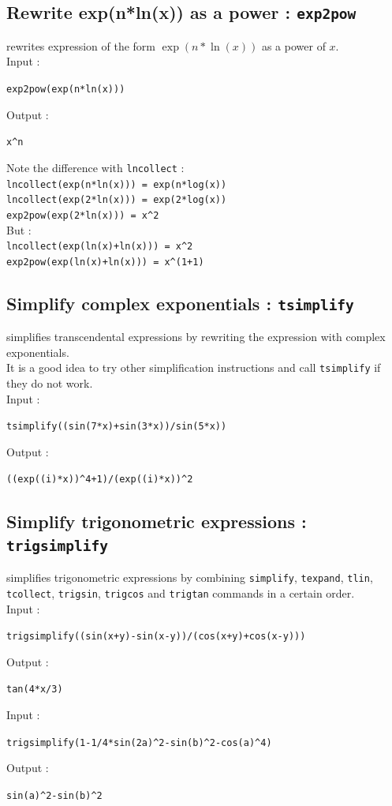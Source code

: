 \documentclass[a4paper,11pt]{book}
\begin{document}
\subsection{Rewrite exp(n*ln(x)) as a power : {\tt exp2pow}}
 rewrites expression of the form $\exp(n*\ln(x))$
as a power of $x$.\\
Input :
\begin{center}{\tt  exp2pow(exp(n*ln(x)))}\end{center}
Output :
\begin{center}{\tt x\verb|^|n}\end{center}
Note the difference with {\tt lncollect} :\\
{\tt lncollect(exp(n*ln(x))) = exp(n*log(x))}\\
{\tt lncollect(exp(2*ln(x))) = exp(2*log(x))}\\
{\tt exp2pow(exp(2*ln(x))) = x\verb|^|2 }\\
But :\\
{\tt lncollect(exp(ln(x)+ln(x))) = x\verb|^|2}\\
{\tt exp2pow(exp(ln(x)+ln(x))) = x\verb|^|(1+1)}\\

\subsection{Simplify complex exponentials : {\tt tsimplify}}
 simplifies transcendental expressions 
by rewriting the expression with complex exponentials.\\
It is a good idea to try other simplification instructions
and call {\tt tsimplify} if they do not work.\\ 
Input :
\begin{center}{\tt tsimplify((sin(7*x)+sin(3*x))/sin(5*x))}\end{center}
Output :
\begin{center}{\tt ((exp((i)*x))\verb|^|4+1)/(exp((i)*x))\verb|^|2 }\end{center}

\subsection{Simplify trigonometric expressions : {\tt trigsimplify}}
 simplifies trigonometric expressions
by combining {\tt simplify}, {\tt texpand}, {\tt tlin}, {\tt tcollect}, {\tt trigsin}, {\tt trigcos} and {\tt trigtan} commands in a certain order.\\
Input :
\begin{center}{\tt trigsimplify((sin(x+y)-sin(x-y))/(cos(x+y)+cos(x-y)))}\end{center}
Output :
\begin{center}{\tt tan(4*x/3)}\end{center}
Input :
\begin{center}{\tt trigsimplify(1-1/4*sin(2a)\verb|^|2-sin(b)\verb|^|2-cos(a)\verb|^|4)}\end{center}
Output :
\begin{center}{\tt sin(a)\verb|^|2-sin(b)\verb|^|2}\end{center}
\end{document}
